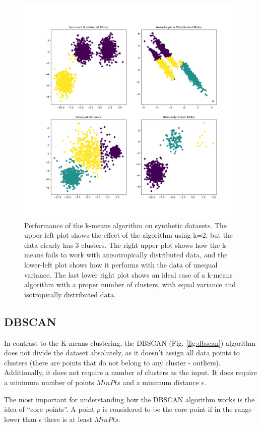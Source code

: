 
\begin{figure}
  \centering
  \includegraphics[width=0.6\linewidth]{figures/chapter3/sphx_glr_plot_kmeans_assumptions_001.png}
  \caption{Performance of the k-means algorithm on synthetic datasets. The upper left plot shows the effect of the algorithm using k=2, but the data clearly has 3 clusters. The right upper plot shows how the k-means fails to work with anisotropically distributed data, and the lower-left plot shows how it performs with the data of unequal variance. The last lower right plot shows an ideal case of a k-means algorithm with a proper number of clusters, with equal variance and isotropically distributed data. }
  \label{fig:kmeans}
\end{figure}


\subsection{DBSCAN}

In contrast to the K-means clustering, the DBSCAN\cite{Ester96adensity-based} (Fig. \ref{fig:dbscan}) algorithm does not divide the dataset absolutely, as it doesn't assign all data points to clusters (there are points that do not belong to any cluster - outliers). Additionally, it does not require a number of clusters as the input.
It does require a minimum number of points $MinPts$ and a minimum distance $\epsilon$.

The most important for understanding how the DBSCAN algorithm works is the idea of  ``core points''.
A point $p$ is considered to be the core point if in the range lower than $\epsilon$ there is at least $MinPts$.

